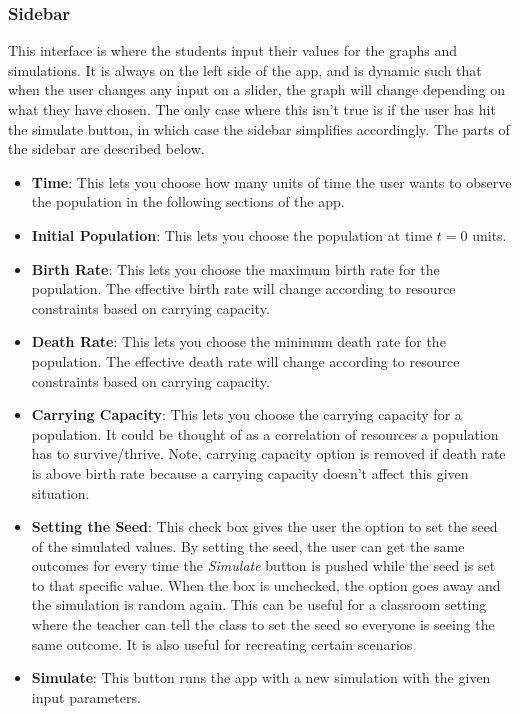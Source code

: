 \documentclass{article}\usepackage[]{graphicx}\usepackage[]{color}
\begin{document}
\subsubsection{Sidebar}

This interface is where the students input their values for the graphs and simulations. It is always on the left side of the app, and is dynamic such that when the user changes any input on a slider, the graph will change depending on what they have chosen. The only case where this isn't true is if the user has hit the simulate button, in which case the sidebar simplifies accordingly. The parts of the sidebar are described below.

\begin{itemize}

\item \textbf{Time}: This lets you choose how many units of time the user wants to observe the population in the following sections of the app.

\item \textbf{Initial Population}: This lets you choose the population at time \(t = 0\) units.

\item \textbf{Birth Rate}: This lets you choose the maximum birth rate for the population. The effective birth rate will change according to resource constraints based on carrying capacity.

\item \textbf{Death Rate}: This lets you choose the minimum death rate for the population. The effective death rate will change according to resource constraints based on carrying capacity.

\item \textbf{Carrying Capacity}: This lets you choose the carrying capacity for a population. It could be thought of as a correlation of resources a population has to survive/thrive. Note, carrying capacity option is removed if death rate is above birth rate because a carrying capacity doesn't affect this given situation.

\item \textbf{Setting the Seed}: This check box gives the user the option to set the seed of the simulated values. By setting the seed, the user can get the same outcomes for every time the \textit{Simulate} button is pushed while the seed is set to that specific value. When the box is unchecked, the option goes away and the simulation is random again. This can be useful for a classroom setting where the teacher can tell the class to set the seed so everyone is seeing the same outcome. It is also useful for recreating certain scenarios

\item \textbf{Simulate}: This button runs the app with a new simulation with the given input parameters.

\end{itemize}
\end{document}
